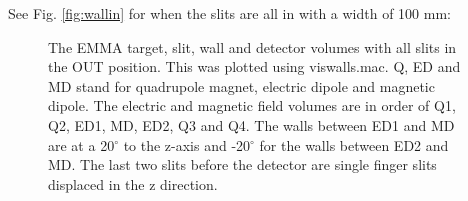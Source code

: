 \documentclass[letter,11pt]{article}
\begin{document}
See Fig. \ref{fig:wallin} for when the slits are all in with a width of 100 mm:
{\footnotesize }

\begin{figure}
\centering
	\caption{The EMMA target, slit, wall and detector volumes with all slits in the OUT position. This was plotted using viswalls.mac. Q, ED and MD stand for quadrupole magnet, electric dipole and magnetic dipole. The electric and magnetic field volumes are in order of Q1, Q2, ED1, MD, ED2, Q3 and Q4. The walls between ED1 and MD are at a 20$^{\circ}$ to the z-axis and -20$^{\circ}$ for the walls between ED2 and MD. The last two slits before the detector are single finger slits displaced in the z direction.}
	\label{fig:wallout}
\end{figure}
\end{document}
